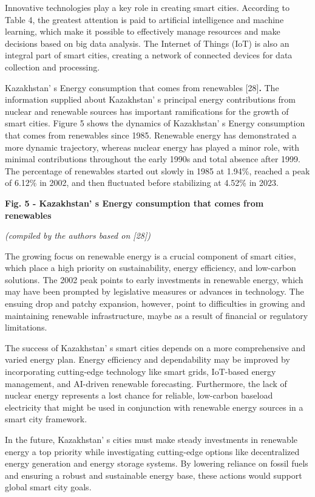 Innovative technologies play a key role in creating smart cities.
According to Table 4, the greatest attention is paid to artificial
intelligence and machine learning, which make it possible to effectively
manage resources and make decisions based on big data analysis. The
Internet of Things (IoT) is also an integral part of smart cities,
creating a network of connected devices for data collection and
processing.

Kazakhstan' s Energy consumption that comes from
renewables {[}28{]}{\bfseries .} The information supplied about
Kazakhstan' s principal energy contributions from nuclear
and renewable sources has important ramifications for the growth of
smart cities. Figure 5 shows the dynamics of
Kazakhstan' s Energy consumption that comes from
renewables since 1985. Renewable energy has demonstrated a more dynamic
trajectory, whereas nuclear energy has played a minor role, with minimal
contributions throughout the early 1990s and total absence after 1999.
The percentage of renewables started out slowly in 1985 at 1.94\%,
reached a peak of 6.12\% in 2002, and then fluctuated before stabilizing
at 4.52\% in 2023.

{\bfseries Fig. 5 - Kazakhstan' s Energy consumption that comes from renewables}

\emph{(compiled by the authors based on {[}28{]})}

The growing focus on renewable energy is a crucial component of smart
cities, which place a high priority on sustainability, energy
efficiency, and low-carbon solutions. The 2002 peak points to early
investments in renewable energy, which may have been prompted by
legislative measures or advances in technology. The ensuing drop and
patchy expansion, however, point to difficulties in growing and
maintaining renewable infrastructure, maybe as a result of financial or
regulatory limitations.

The success of Kazakhstan' s smart cities depends on a
more comprehensive and varied energy plan. Energy efficiency and
dependability may be improved by incorporating cutting-edge technology
like smart grids, IoT-based energy management, and AI-driven renewable
forecasting. Furthermore, the lack of nuclear energy represents a lost
chance for reliable, low-carbon baseload electricity that might be used
in conjunction with renewable energy sources in a smart city framework.

In the future, Kazakhstan' s cities must make steady
investments in renewable energy a top priority while investigating
cutting-edge options like decentralized energy generation and energy
storage systems. By lowering reliance on fossil fuels and ensuring a
robust and sustainable energy base, these actions would support global
smart city goals.

